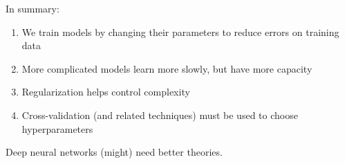 In summary:
\vspace{1cm}
\pause{}
\begin{enumerate}
	\item We train models by changing their parameters to reduce errors on training data \pause{}
	\item More complicated models learn more slowly, but have more capacity\pause{}
	\item Regularization helps control complexity\pause{}
	\item Cross-validation (and related techniques)  must be used to choose hyperparameters\pause{}
\end{enumerate}
\vspace{1cm}
Deep neural networks (might) need better theories.